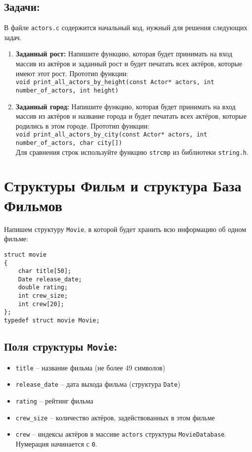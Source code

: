 \documentclass{article}
\begin{document}
\subsection*{Задачи:}
В файле \texttt{actors.c} содержится начальный код, нужный для решения следующих задач.
\begin{enumerate}
\item \textbf{Заданный рост:} Напишите функцию, которая будет принимать на вход массив из актёров и заданный рост и будет печатать всех актёров, которые имеют этот рост. Прототип функции:\\
\texttt{void print\_all\_actors\_by\_height(const Actor* actors, int number\_of\_actors, int height)}
\item \textbf{Заданный город:} Напишите функцию, которая будет принимать на вход массив из актёров и название города и будет печатать всех актёров, которые родились в этом городе. Прототип функции:\\
\texttt{void print\_all\_actors\_by\_city(const Actor* actors, int number\_of\_actors, char city[])}\\
Для сравнения строк используйте функцию \texttt{strcmp} из библиотеки \texttt{string.h}.
\end{enumerate}


\newpage
\section{Структуры Фильм  и структура База Фильмов}
Напишем структуру \texttt{Movie}, в которой будет хранить всю информацию об одном фильме:
\begin{lstlisting}
struct movie 
{
    char title[50];
    Date release_date;
    double rating;
    int crew_size;
    int crew[20];
};
typedef struct movie Movie;
\end{lstlisting}
\subsection*{Поля структуры \texttt{Movie}:}
\begin{itemize}
\item \texttt{title} -- название фильма (не более 49 символов)
\item \texttt{release\_date} -- дата выхода фильма (структура \texttt{Date})
\item \texttt{rating} -- рейтинг фильма
\item \texttt{crew\_size} -- количество актёров, задействованных в этом фильме
\item \texttt{crew} -- индексы актёров в массиве \texttt{actors} структуры \texttt{MovieDatabase}. Нумерация начинается с \texttt{0}.
\end{itemize}
\end{document}
